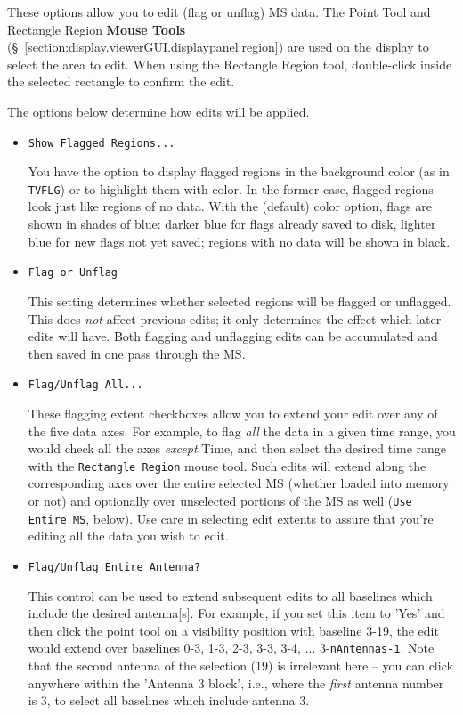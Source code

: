 These options allow you to edit (flag or unflag) MS data.
The Point Tool and Rectangle Region {\bf Mouse Tools}
(\S~\ref{section:display.viewerGUI.displaypanel.region}) are used on
the display to select the area to edit.  When using the Rectangle Region
tool, double-click inside the selected rectangle to confirm the edit.

The options below determine how edits will be applied.

\begin{itemize}

\item {\tt Show Flagged Regions...}

You have the option to display flagged regions in the background
color (as in {\tt TVFLG}) or to highlight them with color.
In the former case, flagged regions look just like regions of no
data.  With the (default) color option, flags are shown in shades of blue:
darker blue for flags already saved to disk, lighter blue for
new flags not yet saved; regions with no data will be shown in black.

\item {\tt Flag or Unflag}

This setting determines whether selected regions will be flagged or
unflagged.  This does {\it not} affect previous
edits; it only determines the effect which later edits
will have.  Both flagging and unflagging edits can be accumulated
and then saved in one pass through the MS.

\item {\tt Flag/Unflag All...}

These flagging extent checkboxes allow you to extend your edit over any
of the five data axes.  For example, to flag {\it all} the data in a given
time range, you would check all the axes {\it except} Time, and then
select the desired time range with the {\tt Rectangle Region} mouse tool.
Such edits will extend along the corresponding axes over the entire selected
MS (whether loaded into memory or not) and optionally over unselected 
portions of the MS as well ({\tt Use Entire MS}, below).  Use care in
selecting edit extents to assure that you're editing all
the data you wish to edit.

\item {\tt Flag/Unflag Entire Antenna?}

This control can be used to extend subsequent edits to all baselines
which include the desired antenna[s].  For example, if you set this item
to 'Yes' and then click the point tool on a visibility position with
baseline 3-19, the edit would extend over baselines 0-3, 1-3, 2-3, 3-3,
3-4, ... 3-{\tt nAntennas-1}.  Note that the second antenna of the selection
(19) is irrelevant here -- you can click anywhere within the 'Antenna 3 block',
i.e., where the {\em first} antenna number is 3, to select all baselines
which include antenna 3.


\end{itemize}
